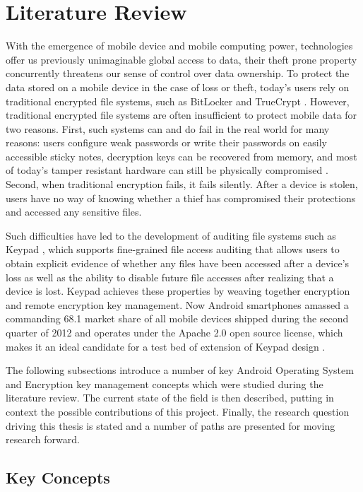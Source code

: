 \section{Literature Review}\label{LitRev}

With the emergence of mobile device and mobile computing power, technologies offer us previously unimaginable global access to data, their theft prone property concurrently threatens our sense of control over data ownership. To protect the data stored on a mobile device in the case of loss or theft, today's users rely on traditional encrypted file systems, such as BitLocker and TrueCrypt \cite{MattB1993}. However, traditional encrypted file systems are often insufficient to protect mobile data for two reasons. First, such systems can and do fail in the real world for many reasons: users configure weak passwords or write their passwords on easily accessible sticky notes, decryption keys can be recovered from memory, and most of today's tamper resistant hardware can still be physically compromised \cite{JAlex2008}. Second, when traditional encryption fails, it fails silently. After a device is stolen, users have no way of knowing whether a thief has compromised their protections and accessed any sensitive files.

Such difficulties have led to the development of auditing file systems such as Keypad \cite{Roxana2011}, which supports fine-grained file access auditing that allows users to obtain explicit evidence of whether any files have been accessed after a device's loss as well as the ability to disable future file accesses after realizing that a device is lost. Keypad achieves these properties by weaving together encryption and remote encryption key management. Now Android smartphones amassed a commanding 68.1 market share of all mobile devices shipped during the second quarter of 2012 and operates under the Apache 2.0 open source license, which makes it an ideal candidate for a test bed of extension of Keypad design \cite{mobile2012}.

The following subsections introduce a number of key Android Operating System and Encryption key management concepts which were studied during the literature review. The current state of the field is then described, putting in context the possible contributions of this project. Finally, the research question driving this thesis is stated and a number of paths are presented for moving research forward.

\subsection{Key Concepts}\label{LitRevConcepts}

